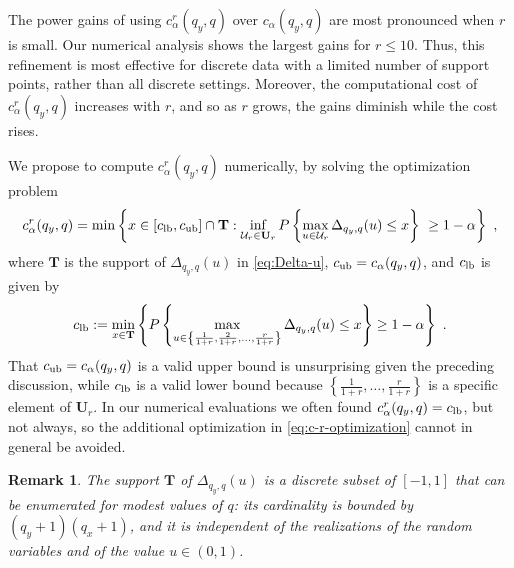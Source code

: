 \documentclass[11pt]{article}
\numberwithin{equation}{section}
\newtheorem{remark}{Remark}%
\begin{document}
The power gains of using $c_{\alpha}^{r}(q_y, q)$ over $c_{\alpha}(q_y, q)$ are most pronounced when $r$ is small. Our numerical analysis shows the largest gains for $r \le 10$. Thus, this refinement is most effective for discrete data with a limited number of support points, rather than all discrete settings. Moreover, the computational cost of $c_{\alpha}^{r}(q_y, q)$ increases with $r$, and so as $r$ grows, the gains diminish while the cost rises. 

We propose to compute $c_{\alpha}^{r}(q_y, q)$ numerically, by solving the optimization problem
\begin{equation}\label{eq:c-r-optimization}
    c_{\alpha}^{r}(q_y, q) =  \min \left\{ x\in [c_{\rm lb}, c_{\rm ub}] \cap \mathbf{T}: \inf_{\mathcal{U}_r\in  \mathbf{U}_r }
    P\left\lbrace \max_{u\in\mathcal{U}_r} \Delta_{q_y,q}(u)   \le x \right\rbrace~ \ge 1-\alpha \right\}~,
\end{equation}
where $\mathbf{T}$ is the support of $\Delta_{q_y,q}(u)$ in \eqref{eq:Delta-u}, $c_{\rm ub} = c_{\alpha}(q_y, q)$, and $c_{\rm lb}$ is given by
\begin{equation*}
    c_{\rm lb} := \min_{x\in\mathbf T} \left\{
    P\left\lbrace \max_{u\in\left\{\frac{1}{1+r},\frac{2}{1+r},\dots,\frac{r}{1+r} \right\}} \Delta_{q_y,q}(u)   \le x \right\rbrace \ge 1-\alpha \right\}~.
\end{equation*}
That $c_{\rm ub} = c_{\alpha}(q_y, q)$ is a valid upper bound is unsurprising given the preceding discussion, while $c_{\rm lb}$ is a valid lower bound because $\left\{\frac{1}{1+r},\dots,\frac{r}{1+r}\right\}$ is a specific element of $\mathbf U_{r}$. In our numerical evaluations we often found $c_{\alpha}^{r}(q_y, q) = c_{\rm lb}$, but not always, so the additional optimization in \eqref{eq:c-r-optimization} cannot in general be avoided.

\begin{remark}\label{rem:support}
    The support $\mathbf{T}$ of $\Delta_{q_y,q}(u)$ is a discrete subset of $[-1,1]$ that can be enumerated for modest values of $q$: its cardinality is bounded by $(q_y+1)(q_x+1)$, and it is independent of the realizations of the random variables and of the value $u \in (0,1)$.
\end{remark}
\end{document}
